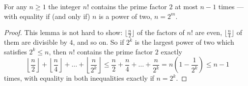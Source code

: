 \begin{theorem}
  \label{little_lemma}
  \leanok
  For any $n \ge 1$ the integer $n!$ contains the prime factor $2$ at most $n-1$ times --- with equality if (and only if) $n$ is a power of two, $n = 2^m$.
\end{theorem}
\begin{proof}
  This lemma is not hard to show:
  $\lfloor \frac{n}{2} \rfloor$ of the factors of $n!$ are even, $\lfloor \frac{n}{4} \rfloor$ of them are divisible by $4$, and so on.
  So if $2^k$ is the largest power of two which satisfies $2^k \le n$, then $n!$ contains the prime factor $2$ exactly
  \[
  \left\lfloor \frac{n}{2} \right\rfloor + \left\lfloor \frac{n}{4} \right\rfloor + \dots + \left\lfloor \frac{n}{2^k} \right\rfloor \le \frac{n}{2} + \frac{n}{4} + \dots + \frac{n}{2^k} = n \left( 1 - \frac{1}{2^k} \right) \le n-1
  \]
  times, with equality in both inequalities exactly if $n = 2^k$.
\end{proof}

